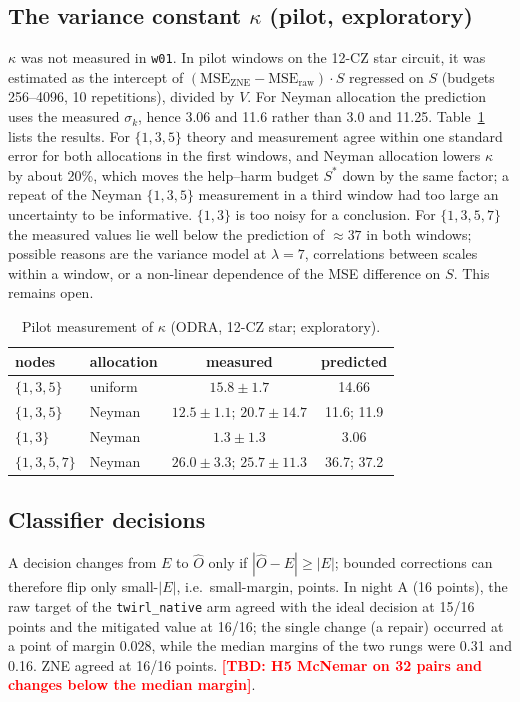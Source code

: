 \documentclass[conference]{IEEEtran}
\newcommand{\TBD}[1]{\textcolor{red}{\textbf{[TBD: #1]}}}
\newcommand{\arm}[1]{\texttt{#1}}
\begin{document}
\subsection{The variance constant $\kappa$ (pilot, exploratory)}
$\kappa$ was not measured in \texttt{w01}. In pilot windows on the 12-CZ star circuit, it was estimated
as the intercept of $(\mathrm{MSE}_{\text{ZNE}}-\mathrm{MSE}_{\text{raw}})\cdot S$ regressed on
$S$ (budgets 256--4096, 10 repetitions), divided by $V$. For Neyman allocation the prediction
uses the measured $\sigma_k$, hence 3.06 and 11.6 rather than 3.0 and 11.25.
Table~\ref{tab:kappa} lists the results. For $\{1,3,5\}$ theory and measurement agree within
one standard error for both allocations in the first windows, and Neyman allocation lowers
$\kappa$ by about 20\%, which moves the help--harm budget $S^\ast$ down by the same factor; a
repeat of the Neyman $\{1,3,5\}$ measurement in a third window had too large an uncertainty to
be informative. $\{1,3\}$ is too noisy for a conclusion. For $\{1,3,5,7\}$ the measured
values lie well below the prediction of $\approx37$ in both windows; possible reasons are the
variance model at $\lambda=7$, correlations between scales within a window, or a non-linear
dependence of the MSE difference on $S$. This remains open.

\begin{table}[t]
\caption{Pilot measurement of $\kappa$ (ODRA, 12-CZ star; exploratory).}
\label{tab:kappa}
\centering\footnotesize
\begin{tabular}{@{}llcc@{}}
\toprule
nodes & allocation & measured & predicted \\
\midrule
$\{1,3,5\}$ & uniform & $15.8\pm1.7$ & 14.66 \\
$\{1,3,5\}$ & Neyman & $12.5\pm1.1$; $20.7\pm14.7$ & 11.6; 11.9 \\
$\{1,3\}$ & Neyman & $1.3\pm1.3$ & 3.06 \\
$\{1,3,5,7\}$ & Neyman & $26.0\pm3.3$; $25.7\pm11.3$ & 36.7; 37.2 \\
\bottomrule
\end{tabular}
\end{table}

\subsection{Classifier decisions}
A decision changes from $E$ to $\hat O$ only if $|\hat O-E|\ge|E|$; bounded corrections can
therefore flip only small-$|E|$, i.e.\ small-margin, points. In night A (16 points), the
raw target of the \arm{twirl\_native} arm agreed with the ideal decision at 15/16 points and
the mitigated value at 16/16; the single change (a repair) occurred at a point of margin
0.028, while the median margins of the two rungs were 0.31 and 0.16. ZNE agreed at 16/16
points. \TBD{H5 McNemar on 32 pairs and changes below the median margin}.
\end{document}
